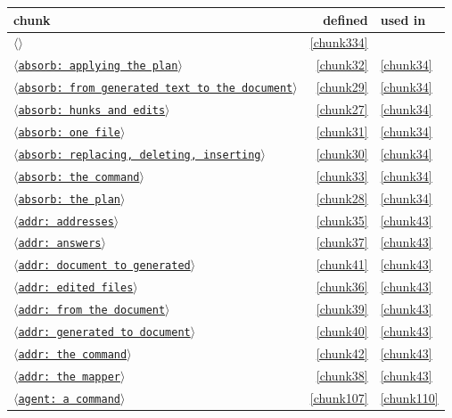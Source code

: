 \documentclass[10pt,a4paper]{article}
\newcounter{chunk}
\newcommand{\chunkname}[1]{\ensuremath{\langle}\texttt{#1}\ensuremath{\rangle}}
\begin{document}
\begin{longtable}{@{}p{}rp{}@{}}
\textbf{chunk} & \textbf{defined} & \textbf{used in} \\\hline
\endhead
\hyperref[chunk334]{\chunkname{}} & \ref*{chunk334} &  \\
\hyperref[chunk32]{\chunkname{absorb: applying the plan}} & \ref*{chunk32} & \hyperref[chunk34]{\ref*{chunk34}} \\
\hyperref[chunk29]{\chunkname{absorb: from generated text to the document}} & \ref*{chunk29} & \hyperref[chunk34]{\ref*{chunk34}} \\
\hyperref[chunk27]{\chunkname{absorb: hunks and edits}} & \ref*{chunk27} & \hyperref[chunk34]{\ref*{chunk34}} \\
\hyperref[chunk31]{\chunkname{absorb: one file}} & \ref*{chunk31} & \hyperref[chunk34]{\ref*{chunk34}} \\
\hyperref[chunk30]{\chunkname{absorb: replacing, deleting, inserting}} & \ref*{chunk30} & \hyperref[chunk34]{\ref*{chunk34}} \\
\hyperref[chunk33]{\chunkname{absorb: the command}} & \ref*{chunk33} & \hyperref[chunk34]{\ref*{chunk34}} \\
\hyperref[chunk28]{\chunkname{absorb: the plan}} & \ref*{chunk28} & \hyperref[chunk34]{\ref*{chunk34}} \\
\hyperref[chunk35]{\chunkname{addr: addresses}} & \ref*{chunk35} & \hyperref[chunk43]{\ref*{chunk43}} \\
\hyperref[chunk37]{\chunkname{addr: answers}} & \ref*{chunk37} & \hyperref[chunk43]{\ref*{chunk43}} \\
\hyperref[chunk41]{\chunkname{addr: document to generated}} & \ref*{chunk41} & \hyperref[chunk43]{\ref*{chunk43}} \\
\hyperref[chunk36]{\chunkname{addr: edited files}} & \ref*{chunk36} & \hyperref[chunk43]{\ref*{chunk43}} \\
\hyperref[chunk39]{\chunkname{addr: from the document}} & \ref*{chunk39} & \hyperref[chunk43]{\ref*{chunk43}} \\
\hyperref[chunk40]{\chunkname{addr: generated to document}} & \ref*{chunk40} & \hyperref[chunk43]{\ref*{chunk43}} \\
\hyperref[chunk42]{\chunkname{addr: the command}} & \ref*{chunk42} & \hyperref[chunk43]{\ref*{chunk43}} \\
\hyperref[chunk38]{\chunkname{addr: the mapper}} & \ref*{chunk38} & \hyperref[chunk43]{\ref*{chunk43}} \\
\hyperref[chunk107]{\chunkname{agent: a command}} & \ref*{chunk107} & \hyperref[chunk110]{\ref*{chunk110}} \\

\end{longtable}
\end{document}
